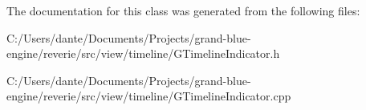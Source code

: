 The documentation for this class was generated from the following files\+:\begin{DoxyCompactItemize}
\item 
C\+:/\+Users/dante/\+Documents/\+Projects/grand-\/blue-\/engine/reverie/src/view/timeline/G\+Timeline\+Indicator.\+h\item 
C\+:/\+Users/dante/\+Documents/\+Projects/grand-\/blue-\/engine/reverie/src/view/timeline/G\+Timeline\+Indicator.\+cpp\end{DoxyCompactItemize}
